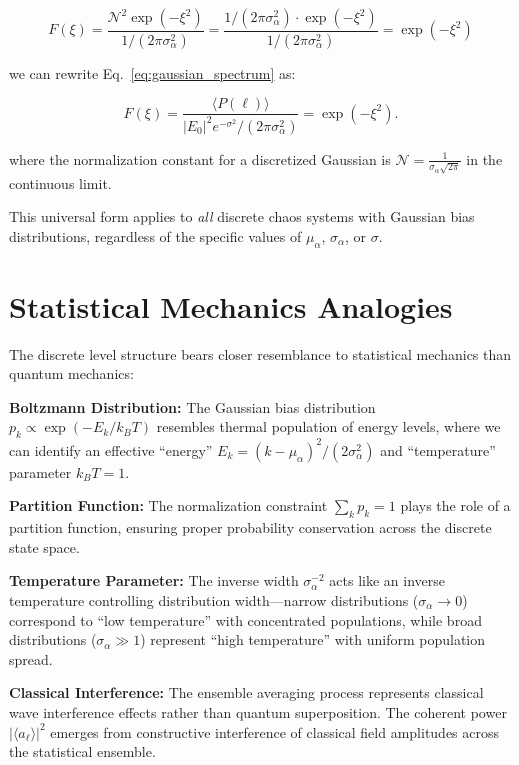 \documentclass[a4paper,12pt]{article}
\newcommand{\ev}[1]{\langle #1 \rangle}
\begin{document}
\begin{equation}
F(\xi) = \frac{\mathcal{N}^2 \exp(-\xi^2)}{1/(2\pi\sigma_\alpha^2)} = \frac{1/(2\pi\sigma_\alpha^2) \cdot \exp(-\xi^2)}{1/(2\pi\sigma_\alpha^2)} = \exp(-\xi^2)
\end{equation}

we can rewrite Eq.~\ref{eq:gaussian_spectrum} as:

\begin{equation}
    F(\xi) = \frac{\ev{P(\ell)}}{|E_0|^2 e^{-\sigma^2}/(2\pi\sigma_\alpha^2)} = \exp(-\xi^2).
    \label{eq:universal_profile}
\end{equation}

where the normalization constant for a discretized Gaussian is $\mathcal{N} = \frac{1}{\sigma_\alpha \sqrt{2\pi}}$ in 
the continuous limit.

This universal form applies to \emph{all} discrete chaos systems with Gaussian bias distributions, regardless of the specific values of $\mu_\alpha$, $\sigma_\alpha$, or $\sigma$.


\section{Statistical Mechanics Analogies}

The discrete level structure bears closer resemblance to statistical mechanics than quantum mechanics:

\textbf{Boltzmann Distribution:} The Gaussian bias distribution $p_k \propto \exp(-E_k/k_BT)$ resembles thermal population of energy levels, where we can identify an effective ``energy'' $E_k = (k-\mu_\alpha)^2/(2\sigma_\alpha^2)$ and ``temperature'' parameter $k_BT = 1$.

\textbf{Partition Function:} The normalization constraint $\sum_k p_k = 1$ plays the role of a partition function, ensuring proper probability conservation across the discrete state space.

\textbf{Temperature Parameter:} The inverse width $\sigma_\alpha^{-2}$ acts like an inverse temperature controlling distribution width---narrow distributions ($\sigma_\alpha \to 0$) correspond to ``low temperature'' with concentrated populations, while broad distributions ($\sigma_\alpha \gg 1$) represent ``high temperature'' with uniform population spread.

\textbf{Classical Interference:} The ensemble averaging process represents classical wave interference effects rather than quantum superposition. The coherent power $|\ev{a_\ell}|^2$ emerges from constructive interference of classical field amplitudes across the statistical ensemble.
\end{document}
